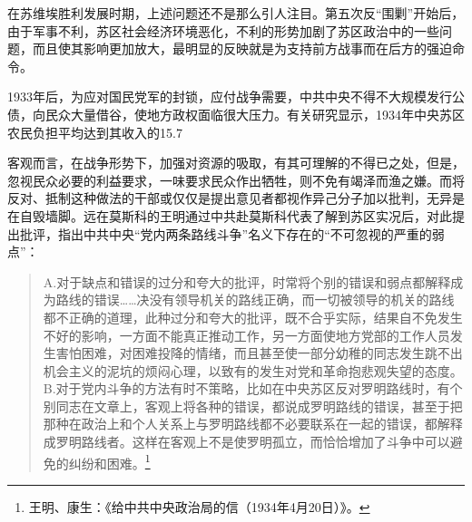 在苏维埃胜利发展时期，上述问题还不是那么引人注目。第五次反“围剿”开始后，由于军事不利，苏区社会经济环境恶化，不利的形势加剧了苏区政治中的一些问题，而且使其影响更加放大，最明显的反映就是为支持前方战事而在后方的强迫命令。


1933年后，为应对国民党军的封锁，应付战争需要，中共中央不得不大规模发行公债，向民众大量借谷，使地方政权面临很大压力。有关研究显示，1934年中央苏区农民负担平均达到其收入的15.7%


客观而言，在战争形势下，加强对资源的吸取，有其可理解的不得已之处，但是，忽视民众必要的利益要求，一味要求民众作出牺牲，则不免有竭泽而渔之嫌。而将反对、抵制这种做法的干部或仅仅是提出意见者都视作异己分子加以批判，无异是在自毁墙脚。远在莫斯科的王明通过中共赴莫斯科代表了解到苏区实况后，对此提出批评，指出中共中央“党内两条路线斗争”名义下存在的“不可忽视的严重的弱点”：

\begin{quote}

A.对于缺点和错误的过分和夸大的批评，时常将个别的错误和弱点都解释成为路线的错误……决没有领导机关的路线正确，而一切被领导的机关的路线都不正确的道理，此种过分和夸大的批评，既不合乎实际，结果自不免发生不好的影响，一方面不能真正推动工作，另一方面使地方党部的工作人员发生害怕困难，对困难投降的情绪，而且甚至使一部分幼稚的同志发生跳不出机会主义的泥坑的烦闷心理，以致有的发生对党和革命抱悲观失望的态度。B.对于党内斗争的方法有时不策略，比如在中央苏区反对罗明路线时，有个别同志在文章上，客观上将各种的错误，都说成罗明路线的错误，甚至于把那种在政治上和个人关系上与罗明路线都不必要联系在一起的错误，都解释成罗明路线者。这样在客观上不是使罗明孤立，而恰恰增加了斗争中可以避免的纠纷和困难。\footnote{王明、康生：《给中共中央政治局的信（1934年4月20日）》。}
\end{quote}


